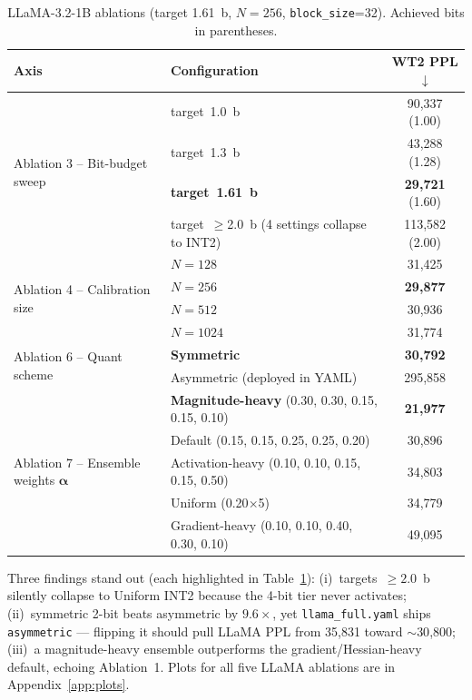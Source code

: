 \documentclass[11pt]{article}
\begin{document}
\begin{table}[!ht]
\footnotesize
\centering
\setlength{\tabcolsep}{5pt}
\renewcommand{\arraystretch}{0.95}
\caption{LLaMA-3.2-1B ablations (target 1.61~b, $N{=}256$, \texttt{block\_size}=32).
Achieved bits in parentheses.}
\label{tab:abl_llama}
\begin{tabular}{@{}llc@{}}
\toprule
Axis & Configuration & WT2 PPL$\downarrow$ \\
\midrule
\multirow{4}{*}{Ablation 3 -- Bit-budget sweep}
  & target~1.0~b   & 90{,}337 (1.00) \\
  & target~1.3~b   & 43{,}288 (1.28) \\
  & \textbf{target~1.61~b} & \textbf{29{,}721} (1.60) \\
  & target~$\geq$2.0~b (4 settings collapse to INT2) & 113{,}582 (2.00) \\
\midrule
\multirow{4}{*}{Ablation 4 -- Calibration size}
  & $N{=}128$  & 31{,}425 \\
  & \textbf{$N{=}256$}  & \textbf{29{,}877} \\
  & $N{=}512$  & 30{,}936 \\
  & $N{=}1024$ & 31{,}774 \\
\midrule
\multirow{2}{*}{Ablation 6 -- Quant scheme}
  & \textbf{Symmetric}  & \textbf{30{,}792} \\
  & Asymmetric (deployed in YAML) & 295{,}858 \\
\midrule
\multirow{5}{*}{Ablation 7 -- Ensemble weights $\boldsymbol{\alpha}$}
  & \textbf{Magnitude-heavy} (0.30, 0.30, 0.15, 0.15, 0.10) & \textbf{21{,}977} \\
  & Default (0.15, 0.15, 0.25, 0.25, 0.20) & 30{,}896 \\
  & Activation-heavy (0.10, 0.10, 0.15, 0.15, 0.50) & 34{,}803 \\
  & Uniform (0.20$\times$5)                            & 34{,}779 \\
  & Gradient-heavy (0.10, 0.10, 0.40, 0.30, 0.10)      & 49{,}095 \\
\bottomrule
\end{tabular}
\end{table}

Three findings stand out (each highlighted in Table~\ref{tab:abl_llama}):
(i)~targets~$\geq 2.0$~b silently collapse to Uniform INT2 because the 4-bit tier never
activates;
(ii)~symmetric 2-bit beats asymmetric by $9.6\times$, yet \texttt{llama\_full.yaml} ships
\texttt{asymmetric} --- flipping it should pull LLaMA PPL from 35{,}831 toward $\sim$30{,}800;
(iii)~a magnitude-heavy ensemble outperforms the gradient/Hessian-heavy default,
echoing Ablation~1.
Plots for all five LLaMA ablations are in Appendix~\ref{app:plots}.
\end{document}
